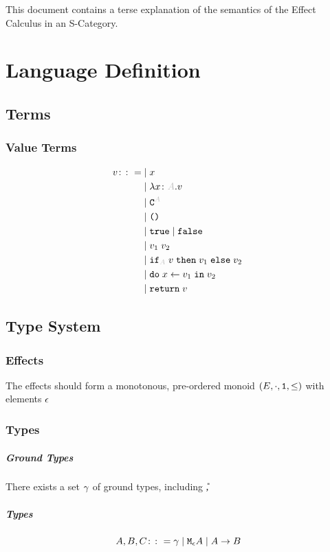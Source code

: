 \documentclass{report}
\begin{document}
\abstract
This document contains a terse explanation of the semantics of the Effect Calculus in an S-Category.

\tableofcontents
\chapter{Language Definition}

\section{Terms}
\subsection{Value Terms}

\begin{equation}
    \begin{split}
        v \gens& \mid  x \\
        & \mid \lam{x}{A}{v} \\
        & \mid \const{A} \\
        & \mid \u \\
        & \mid \t \mid \f \\
        & \mid \apply{v_1}{v_2} \\
        & \mid \pifthenelse{A}{v}{v_1}{v_2} \\
        & \mid \doin{x}{v_1}{v_2} \\
        & \mid \return{v}
        \end{split}
    \end{equation}

\section{Type System}
\subsection{Effects}
The effects should form a monotonous, pre-ordered monoid $(E, \cdot, \texttt{1}, \leq)$ with elements $\epsilon$
\subsection{Types}
    \paragraph{Ground Types}
        There exists a set $\gamma$ of ground types, including \U, \B
    \paragraph{Types}
    $$ A, B, C \colon\colon= \gamma \mid \texttt{M}_{\epsilon}{A} \mid A\rightarrow B $$
\end{document}
